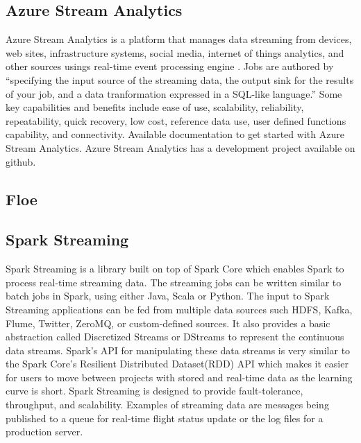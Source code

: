 \subsection{ Azure Stream Analytics}

     Azure Stream Analytics is a platform that manages data streaming
     from devices, web sites, infrastructure systems, social media,
     internet of things analytics, and other sources usings real-time
     event processing engine \cite{www-azurestreamanalytics}. Jobs
     are authored by ``specifying the input source of the streaming
     data, the output sink for the results of your job, and a data
     tranformation expressed in a SQL-like language.''  Some key
     capabilities and benefits include ease of use, scalability,
     reliability, repeatability, quick recovery, low cost, reference
     data use, user defined functions capability, and
     connectivity. \cite{www-docs-microsoft} Available documentation
     to get started with Azure Stream
     Analytics. \cite{www-github-azure} Azure Stream Analytics has a
     development project available on github.

     
\subsection{ Floe}
\subsection{ Spark Streaming \cite{www-apache-spark-stream}}

     Spark Streaming is a library built on top of Spark Core which
     enables Spark to process real-time streaming data. The streaming
     jobs can be written similar to batch jobs in Spark, using either
     Java, Scala or Python. The input to Spark Streaming applications
     can be fed from multiple data sources such HDFS, Kafka, Flume,
     Twitter, ZeroMQ, or custom-defined sources. It also provides a
     basic abstraction called Discretized Streams or DStreams to
     represent the continuous data streams. Spark's API for
     manipulating these data streams is very similar to the Spark
     Core’s Resilient Distributed Dataset(RDD) API
     \cite{www-apache-spark-RDD} which makes it easier for users to
     move between projects with stored and real-time data as the
     learning curve is short.  Spark Streaming is designed to provide
     fault-tolerance, throughput, and scalability. Examples of
     streaming data are messages being published to a queue for
     real-time flight status update or the log files for a production
     server.
     
